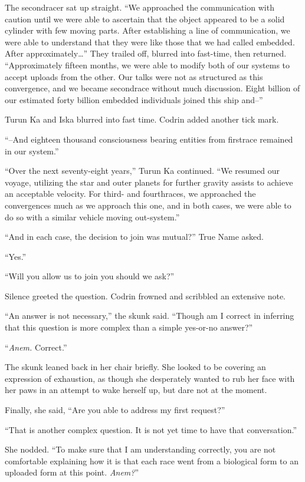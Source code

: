 The secondracer sat up straight. ``We approached the communication with caution until we were able to ascertain that the object appeared to be a solid cylinder with few moving parts. After establishing a line of communication, we were able to understand that they were like those that we had called embedded. After approximately\ldots{}'' They trailed off, blurred into fast-time, then returned. ``Approximately fifteen months, we were able to modify both of our systems to accept uploads from the other. Our talks were not as structured as this convergence, and we became secondrace without much discussion. Eight billion of our estimated forty billion embedded individuals joined this ship and--''

Turun Ka and Iska blurred into fast time. Codrin added another tick mark.

``--And eighteen thousand consciousness bearing entities from firstrace remained in our system.''

``Over the next seventy-eight years,'' Turun Ka continued. ``We resumed our voyage, utilizing the star and outer planets for further gravity assists to achieve an acceptable velocity. For third- and fourthraces, we approached the convergences much as we approach this one, and in both cases, we were able to do so with a similar vehicle moving out-system.''

``And in each case, the decision to join was mutual?'' True Name asked.

``Yes.''

``Will you allow us to join you should we ask?''

Silence greeted the question. Codrin frowned and scribbled an extensive note.

``An answer is not necessary,'' the skunk said. ``Though am I correct in inferring that this question is more complex than a simple yes-or-no answer?''

``\emph{Anem.} Correct.''

The skunk leaned back in her chair briefly. She looked to be covering an expression of exhaustion, as though she desperately wanted to rub her face with her paws in an attempt to wake herself up, but dare not at the moment.

Finally, she said, ``Are you able to address my first request?''

``That is another complex question. It is not yet time to have that conversation.''

She nodded. ``To make sure that I am understanding correctly, you are not comfortable explaining how it is that each race went from a biological form to an uploaded form at this point. \emph{Anem?}''

